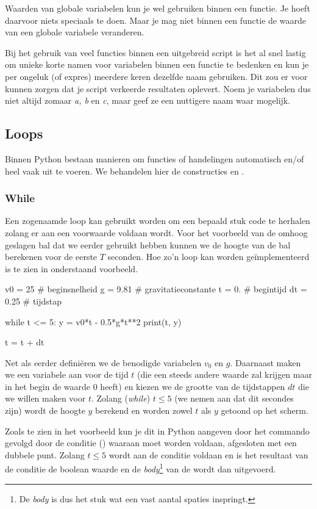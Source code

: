 \documentclass[a4paper,11pt, fleqn]{article}
\begin{document}
Waarden van globale variabelen kun je wel gebruiken binnen een functie. Je hoeft daarvoor niets speciaals te doen. Maar je mag niet binnen een functie de waarde van een globale variabele veranderen.

Bij het gebruik van veel functies binnen een uitgebreid script is het al snel lastig om unieke korte namen voor variabelen binnen een functie te bedenken en kun je per ongeluk (of expres) meerdere keren dezelfde naam gebruiken. Dit zou er voor kunnen zorgen dat je script verkeerde resultaten oplevert. Noem je variabelen dus niet altijd zomaar \textit{a, b} en \textit{c}, maar geef ze een nuttigere naam waar mogelijk.

\subsection{Loops}
Binnen Python bestaan manieren om functies of handelingen automatisch en/of heel vaak uit te voeren. We behandelen hier de constructies  en .

\subsubsection{While}
Een zogenaamde  loop kan gebruikt worden om een bepaald stuk code te herhalen zolang er aan een voorwaarde voldaan wordt. Voor het voorbeeld van de omhoog geslagen bal dat we eerder gebruikt hebben kunnen we de hoogte van de bal berekenen voor de eerste $T$ seconden. Hoe zo'n loop kan worden ge\"implementeerd is te zien in onderstaand voorbeeld.

\begin{python}
v0 = 25   # beginsnelheid
g = 9.81  # gravitatieconstante
t = 0.    # begintijd
dt = 0.25 # tijdstap

while t <= 5:
    y = v0*t - 0.5*g*t**2
    print(t, y)
    
    t = t + dt
\end{python}

Net als eerder defini\"eren we de benodigde variabelen $v_0$ en $g$. Daarnaast maken we een variabele aan voor de tijd $t$ (die een steeds andere waarde zal krijgen maar in het begin de waarde 0 heeft) en kiezen we de grootte van de tijdstappen $dt$ die we willen maken voor $t$. Zolang (\textit{while}) $t \leq 5$ (we nemen aan dat dit secondes zijn)  wordt de hoogte $y$ berekend en worden zowel $t$ als $y$ getoond op het scherm. 

Zoals te zien in het voorbeeld kun je dit in Python aangeven door het commando  gevolgd door de conditie () waaraan moet worden voldaan, afgesloten met een dubbele punt.
Zolang $t\le5$ wordt aan de conditie voldaan en is het resultaat van de conditie de boolean waarde  en de \textit{body}\footnote{De \textit{body} is dus het stuk wat een vast aantal spaties inspringt.} van de  wordt dan uitgevoerd.
\end{document}

